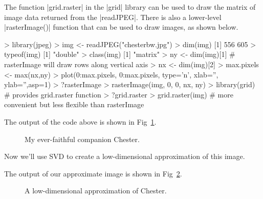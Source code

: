 The function |grid.raster| in the |grid| library can be used to draw the matrix of image data returned from the |readJPEG|.  There is also a lower-level |rasterImage()| function that can be used to draw images, as shown below.
%
\begin{R}
> library(jpeg)
> img <- readJPEG("chesterbw.jpg")
> dim(img)
[1] 556 605
> typeof(img)
[1] "double"
> class(img)
[1] "matrix"
> ny <- dim(img)[1]  # rasterImage will draw rows along vertical axis
> nx <- dim(img)[2]
> max.pixels <- max(nx,ny)
> plot(0:max.pixels, 0:max.pixels, type='n', xlab='', ylab='',asp=1)
> ?rasterImage
> rasterImage(img, 0, 0, nx, ny)
> library(grid) # provides grid.raster function
> ?grid.raster
> grid.raster(img)  # more convenient but less flexible than rasterImage
\end{R}
The output of the code above is shown in Fig~\ref{fig:chester}.
\begin{figure}[ht!]
  \caption{My ever-faithful companion Chester.\label{fig:chester}}
\end{figure}


Now we'll use SVD to create a low-dimensional approximation of this image.
%
%
The output of our approximate image is shown in Fig~\ref{fig:chester15}.
\begin{figure}[ht!]
  \caption{A low-dimensional approximation of Chester.\label{fig:chester15}}
\end{figure}


